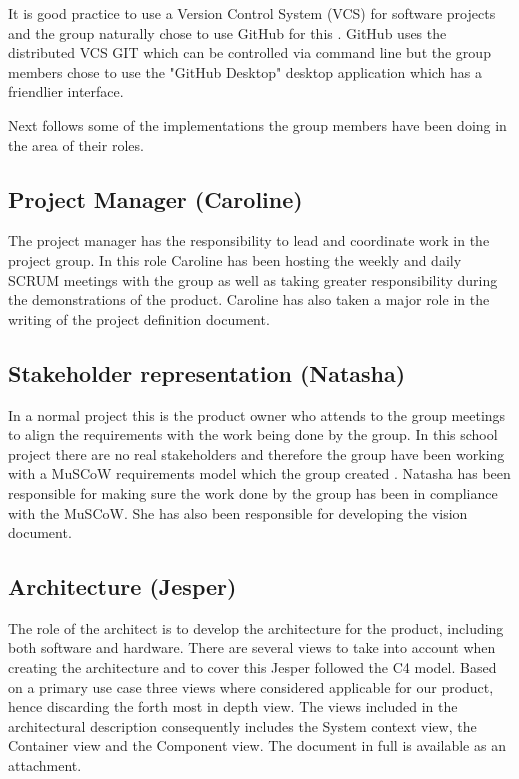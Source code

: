 It is good practice to use a Version Control System (VCS) for software projects and the group naturally chose to use GitHub for this \cite{ian_sommerville_software_nodate}. GitHub uses the distributed VCS GIT which can be controlled via command line but the group members chose to use the "GitHub Desktop" desktop application which has a friendlier interface. 

Next follows some of the implementations the group members have been doing in the area of their roles. 

\subsection{Project Manager (Caroline)}
The project manager has the responsibility to lead and coordinate work in the project group. In this role Caroline has been hosting the weekly and daily SCRUM meetings with the group as well as taking greater responsibility during the demonstrations of the product. Caroline has also taken a major role in the writing of the project definition document. 

\subsection{Stakeholder representation (Natasha)}
In a normal project this is the product owner who attends to the group meetings to align the requirements with the work being done by the group. In this school project there are no real stakeholders and therefore the group have been working with a MuSCoW requirements model which the group created \cite{eklund_arbeta_2010}. Natasha has been responsible for making sure the work done by the group has been in compliance with the MuSCoW. She has also been responsible for developing the vision document. 

\subsection{Architecture (Jesper)}
The role of the architect is to develop the architecture for the product, including both software and hardware. There are several views to take into account when creating the architecture and to cover this Jesper followed the C4 model. Based on a primary use case three views where considered applicable for our product, hence discarding the forth most in depth view. The views included in the architectural description consequently includes the System context view, the Container view and the Component view. The document in full is available as an attachment. 

